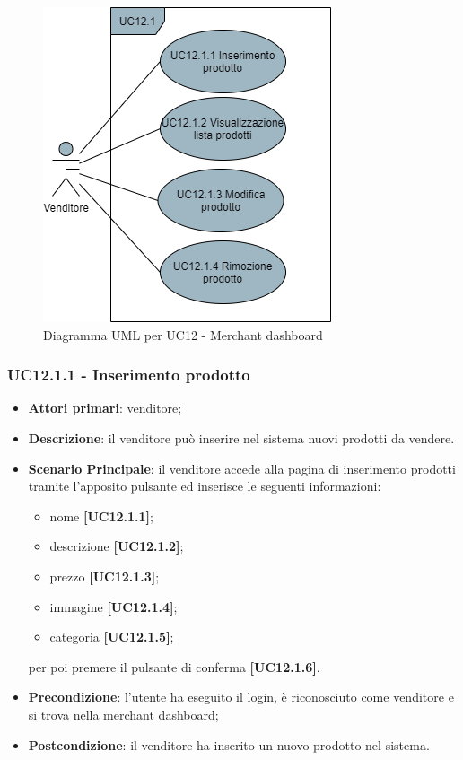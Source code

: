 \begin{figure}[H]
\centering
\includegraphics[scale=0.6]{res/UseCase/Immagini/GestioneProdotti}
\caption{Diagramma UML per UC12 - Merchant dashboard}
\end{figure}

\subsubsection{UC12.1.1 - Inserimento prodotto}
\begin{itemize}
\item \textbf{Attori primari}: venditore;
\item \textbf{Descrizione}: il venditore può inserire nel sistema nuovi prodotti da vendere.
\item \textbf{Scenario Principale}: il venditore accede alla pagina di inserimento prodotti tramite l'apposito pulsante ed inserisce le seguenti informazioni:
\begin{itemize}
	\item nome \textbf{[UC12.1.1]};
	\item descrizione \textbf{[UC12.1.2]};
	\item prezzo \textbf{[UC12.1.3]};
	\item immagine \textbf{[UC12.1.4]};
	\item categoria \textbf{[UC12.1.5]};
\end{itemize}
per poi premere il pulsante di conferma \textbf{[UC12.1.6]}.
\item \textbf{Precondizione}: l'utente ha eseguito il login, è riconosciuto come venditore e si trova nella merchant dashboard;
\item \textbf{Postcondizione}: il venditore ha inserito un nuovo prodotto nel sistema.
\end{itemize}

